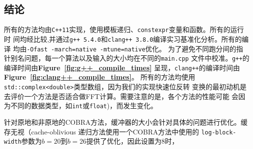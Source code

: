 \documentclass[10pt]{article}
\begin{document}
\begin{CJK*}{UTF8}{gbsn}
\begin{table}[ht!]
  \centering
  \small
    \caption{{\bf 理论运行时间。} 每一个算法的渐进时间都被给出。时间最短并不意味着在实际使用中也具优势：比如，按位
    和按字节方法皆为$\in \Theta(n \log(n))$，但按字节方法拥有一个更优的运行时间
    常数因为它使用一个查询表，一次反转8位。同样地，按位对、COBRA以及递归方法以更加
    连续、局部的方式使用内存，因此它们更具有高速缓存数据存储性优势。对于COBRA方法，
    $t$是缓冲器的大小。归纳异或法的运行时间可能是$\in \Theta(n)$（计前导零数
    是$\Theta(1)$）或者是 $\Theta(n \log(\log(n)))$（前导零数可由硬件获得，因
    此需要$\in \Theta(\log(\log(n)))$步）。递归方法需要$\in \Theta(n \log(n))$步，当使用限制递归深度的半递归方法时亦可以加速至$\in \Theta(n)$步。
   }
  \label{table:theoretical-runtimes}
\end{table}

\section*{结论}
所有的方法均由{\tt C++11}实现，使用模板递归、{\tt constexpr}变量和函数。所有的运行时
间均经比较,并通过{\tt g++ 5.4.0}和{\tt clang++ 3.8.0}编译实习基准化分析。所有的编译
均由{\tt -Ofast -march=native -mtune=native}优化。
为了避免不同跑分间的指针别名问题，每一个算法以及输入的大小均在不同的{\tt main.cpp}
文件中校准。{\tt g++}的编译时间由{\bf Figure~\ref{fig:g++_compile_times}}
呈现，{\tt clang++}的编译时间由{\bf Figure~\ref{fig:clang++_compile_times}}。
所有的方法均使用{\tt std::complex<double>}类型数组，因为我们的实现快速位反转
变换的最初动机是去评价一个方法是否适合做FFT计算。需要注意的是，各个方法的性能可能
会因为不同的数据类型，如{\tt int}或{\tt float})，而发生变化。

针对原地和非原地的COBRA方法，缓冲器的大小会针对具体的问题进行优化。缓存无视（cache-oblivious
递归方法使用一个COBRA方法中使用的
{\tt log-block-width}参数为$b=20$到$b=26$提供了优化，因此设置为$8$时，


\end{CJK*}
\end{document}
